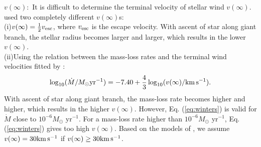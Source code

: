 \documentclass{elsart}
\begin{document}

$v({\infty})$:\ It is difficult to determine the terminal velocity
of stellar wind $v({\infty})$. \cite{lu06} used two completely
different $v({\infty})$s: \\
(i)$v(\infty)=\frac{1}{2}v_{\rm esc}$, where $v_{\rm esc}$ is the
escape velocity. With ascent of star along giant branch, the stellar
radius becomes larger and larger, which results in the lower
$v(\infty)$.\\
(ii)Using the relation between the mass-loss rates and the terminal
wind velocities fitted by \cite{w03}:
\begin{equation}
\log_{10} (\dot{M}/M_\odot{\rm yr}^{-1})=-7.40+\frac{4}{3}\log_{10}
(v({\infty})/{\rm km \, s^{-1}}). \label{eq:winters}
\end{equation} With ascent of star along giant branch, the
mass-loss rate becomes higher and higher, which results in the
higher $v(\infty)$. However, Eq. (\ref{eq:winters}) is valid for
$\dot{M}$ close to $ 10^{-6}M_\odot$ yr$^{-1}$. For a mass-loss rate
higher than $ 10^{-6}M_\odot$ yr$^{-1}$, Eq. (\ref{eq:winters})
gives too high $v(\infty)$. Based on the models of \citet{win00}, we
assume $v(\infty)=30 {\rm km\, s^{-1}}$ if $v(\infty)\geq30 {\rm
km\, s^{-1}}$.
\end{document}
